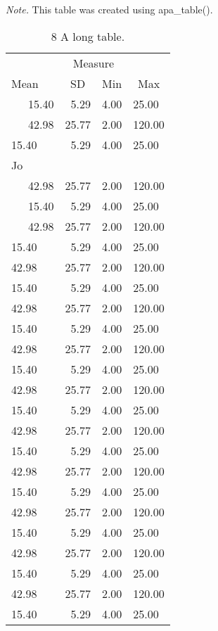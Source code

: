 \documentclass[man]{apa6}
\makeatletter
\newcommand\LastLTentrywidth{1em}
\newlength\longtablewidth
\newcommand{\getlongtablewidth}{\begingroup \ifcsname LT@\roman{LT@tables}\endcsname \global\longtablewidth=0pt \renewcommand{\LT@entry}[2]{\global\advance\longtablewidth by ##2\relax\gdef\LastLTentrywidth{##2}}\@nameuse{LT@\roman{LT@tables}} \fi \endgroup}
\makeatother
\begin{document}
\begin{center}
\begin{ThreePartTable}
\begin{TableNotes}[para]
\textit{Note.} This table was created using apa\_table().
\end{TableNotes}
\begin{longtable}{lrrl}\noalign{\getlongtablewidth\global\LTcapwidth=\longtablewidth}
\caption{\label{tab:unnamed-chunk-8}8 A long table.}\\
\toprule
 & \multicolumn{2}{c}{Measure}  &\\
\cmidrule(r){2-3}
Mean & \multicolumn{1}{c}{SD} & \multicolumn{1}{c}{Min} & \multicolumn{1}{c}{Max}\\
\midrule
\ \ \ 15.40 & 5.29 & 4.00 & 25.00\\
\ \ \ 42.98 & 25.77 & 2.00 & 120.00\\
15.40 & 5.29 & 4.00 & 25.00\\
Jo &  &  & \\ \midrule
\ \ \ 42.98 & 25.77 & 2.00 & 120.00\\
\ \ \ 15.40 & 5.29 & 4.00 & 25.00\\
\ \ \ 42.98 & 25.77 & 2.00 & 120.00\\
15.40 & 5.29 & 4.00 & 25.00\\
42.98 & 25.77 & 2.00 & 120.00\\
15.40 & 5.29 & 4.00 & 25.00\\
42.98 & 25.77 & 2.00 & 120.00\\
15.40 & 5.29 & 4.00 & 25.00\\
42.98 & 25.77 & 2.00 & 120.00\\
15.40 & 5.29 & 4.00 & 25.00\\
42.98 & 25.77 & 2.00 & 120.00\\
15.40 & 5.29 & 4.00 & 25.00\\
42.98 & 25.77 & 2.00 & 120.00\\
15.40 & 5.29 & 4.00 & 25.00\\
42.98 & 25.77 & 2.00 & 120.00\\
15.40 & 5.29 & 4.00 & 25.00\\
42.98 & 25.77 & 2.00 & 120.00\\
15.40 & 5.29 & 4.00 & 25.00\\
42.98 & 25.77 & 2.00 & 120.00\\
15.40 & 5.29 & 4.00 & 25.00\\
42.98 & 25.77 & 2.00 & 120.00\\
15.40 & 5.29 & 4.00 & 25.00\\

\end{longtable}
\end{ThreePartTable}
\end{center}
\end{document}
